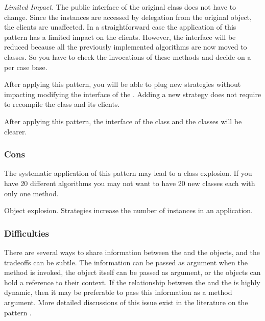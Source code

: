 \documentclass[a4paper,10pt,twoside]{book}
\begin{document}
\begin{bulletlist}
\item \emph{Limited Impact.} The public interface of the original class does not have to change. Since the  instances are accessed by delegation from the original object, the clients are unaffected. In a straightforward case the application of this pattern has a limited impact on the clients. However, the  interface will be reduced because all the previously implemented algorithms are now moved to  classes. So you have to check the invocations of these methods and decide on a per case base. 

\item After applying this pattern, you will be able to plug new strategies without impacting modifying the interface of the . Adding a new strategy does not require to recompile the  class and its clients. 

\item After applying this pattern, the interface of the  class and the  classes will be clearer.
\end{bulletlist}

\subsubsection*{Cons}

\begin{bulletlist}
\item The systematic application of this pattern may lead to a class explosion. If you have 20 different algorithms you may not want to have 20 new classes each with only one method. 

\item Object explosion. Strategies increase the number of instances in an application.
\end{bulletlist}

\subsubsection*{Difficulties}

\begin{bulletlist}
\item There are several ways to share information between the  and the  objects, and the tradeoffs can be subtle. The information can be passed as argument when the  method is invoked, the  object itself can be passed as argument, or the  objects can hold a reference to their context. If the relationship between the  and the  is highly dynamic, then it may be preferable to pass this information as a method argument. More detailed discussions of this issue exist in the literature on the  pattern \cite{Gamm95a} \cite{Alpe98a}.
\end{bulletlist}
\end{document}
